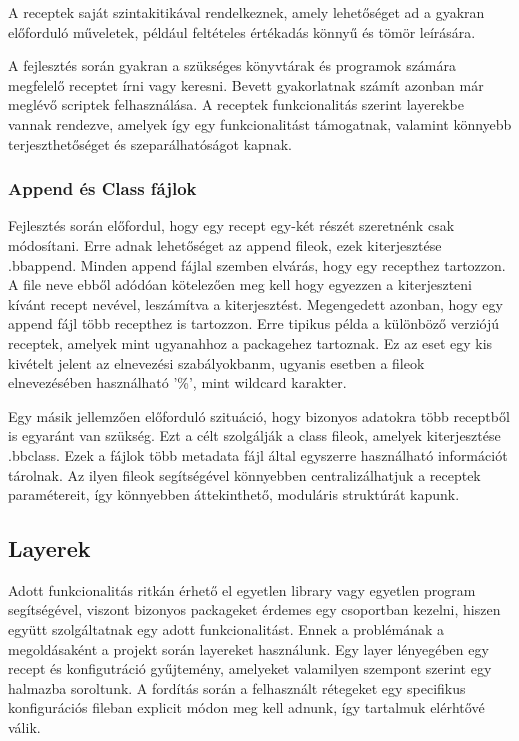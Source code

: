 A receptek saját szintakitikával rendelkeznek, amely lehetőséget ad a gyakran előforduló műveletek, például feltételes értékadás könnyű és tömör leírására. 

A fejlesztés során gyakran a szükséges könyvtárak és programok számára megfelelő receptet írni vagy keresni. Bevett gyakorlatnak számít azonban már meglévő scriptek felhasználása.
A receptek funkcionalitás szerint layerekbe vannak rendezve, amelyek így egy funkcionalitást támogatnak, valamint könnyebb terjeszthetőséget és szeparálhatóságot kapnak.

\subsubsection{Append és Class fájlok}

Fejlesztés során előfordul, hogy egy recept egy-két részét szeretnénk csak módosítani. Erre adnak lehetőséget az append fileok, ezek kiterjesztése .bbappend. Minden append fájlal szemben elvárás, hogy egy recepthez tartozzon.
A file neve ebből adódóan kötelezően meg kell hogy egyezzen a kiterjeszteni kívánt recept nevével, leszámítva a kiterjesztést. Megengedett azonban, hogy egy append fájl több recepthez is tartozzon. Erre tipikus példa a
különböző verziójú receptek, amelyek mint ugyanahhoz a packagehez tartoznak. Ez az eset egy kis kivételt jelent az elnevezési szabályokbanm, ugyanis esetben a fileok elnevezésében használható '\%', mint wildcard karakter. 

Egy másik jellemzően előforduló szituáció, hogy bizonyos adatokra több receptből is egyaránt van szükség. Ezt a célt szolgálják a class fileok, amelyek kiterjesztése .bbclass. Ezek a fájlok több metadata fájl által
egyszerre használható információt tárolnak. Az ilyen fileok segítségével könnyebben centralizálhatjuk a receptek paramétereit, így könnyebben áttekinthető, moduláris struktúrát kapunk.

\subsection{Layerek}

Adott funkcionalitás ritkán érhető el egyetlen library vagy egyetlen program segítségével, viszont bizonyos packageket érdemes egy csoportban kezelni, hiszen együtt szolgáltatnak egy adott funkcionalitást. Ennek
a problémának a megoldásaként a projekt során layereket használunk. Egy layer lényegében egy recept és konfigutráció gyűjtemény, amelyeket valamilyen szempont szerint egy halmazba soroltunk. A fordítás során a
felhasznált rétegeket egy specifikus konfigurációs fileban explicit módon meg kell adnunk, így tartalmuk elérhtővé válik.

